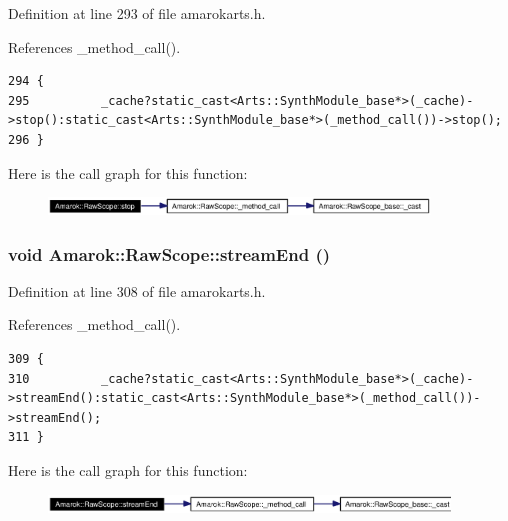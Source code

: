 Definition at line 293 of file amarokarts.h.

References \_\-method\_\-call().



\footnotesize\begin{verbatim}294 {
295          _cache?static_cast<Arts::SynthModule_base*>(_cache)->stop():static_cast<Arts::SynthModule_base*>(_method_call())->stop();
296 }
\end{verbatim}\normalsize 


Here is the call graph for this function:\begin{figure}[H]
\begin{center}
\leavevmode
\includegraphics[width=287pt]{classAmarok_1_1RawScope_Amarok_1_1RawScopea12_cgraph}
\end{center}
\end{figure}
\subsubsection{\setlength{\rightskip}{0pt plus 5cm}void Amarok::Raw\-Scope::stream\-End ()\hspace{0.3cm}{\tt  [inline]}}\label{classAmarok_1_1RawScope_Amarok_1_1RawScopea15}




Definition at line 308 of file amarokarts.h.

References \_\-method\_\-call().



\footnotesize\begin{verbatim}309 {
310          _cache?static_cast<Arts::SynthModule_base*>(_cache)->streamEnd():static_cast<Arts::SynthModule_base*>(_method_call())->streamEnd();
311 }
\end{verbatim}\normalsize 


Here is the call graph for this function:\begin{figure}[H]
\begin{center}
\leavevmode
\includegraphics[width=302pt]{classAmarok_1_1RawScope_Amarok_1_1RawScopea15_cgraph}
\end{center}
\end{figure}
